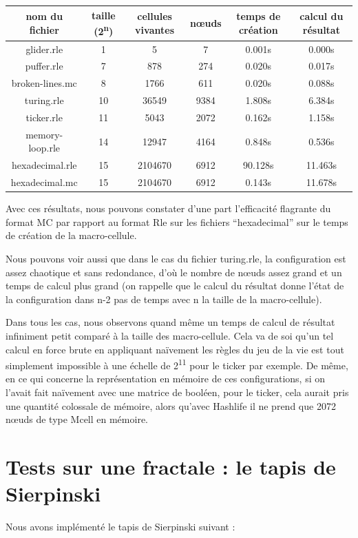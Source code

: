 \documentclass[a4paper,12pt]{report}
\begin{document}
\begin{center}
  \begin{tabular}{| c | c | c | c | c | c |}
    \hline
    nom du fichier & taille (2\textsuperscript{n}) & cellules vivantes
    & n\oe uds & temps de création &
    calcul du résultat \rule[-7pt]{0pt}{20pt} \tabularnewline
    \hline
    glider.rle & 1 & 5 & 7 & 0.001s & 0.000s \tabularnewline
    puffer.rle & 7 & 878 & 274 & 0.020s & 0.017s \tabularnewline
    broken-lines.mc & 8 & 1766 & 611 & 0.020s & 0.088s \tabularnewline
    turing.rle & 10 & 36549 & 9384 & 1.808s & 6.384s \tabularnewline
    ticker.rle & 11 & 5043 & 2072 & 0.162s & 1.158s \tabularnewline
    memory-loop.rle & 14 & 12947 & 4164 & 0.848s & 0.536s \tabularnewline
    hexadecimal.rle & 15 & 2104670 & 6912 & 90.128s & 11.463s \tabularnewline
    hexadecimal.mc & 15 & 2104670 & 6912 & 0.143s & 11.678s \tabularnewline
    \hline
  \end{tabular}
\end{center}

Avec ces résultats, nous pouvons constater d'une part l'efficacité
flagrante du format MC par rapport au format Rle sur les fichiers
``hexadecimal'' sur le temps de création de la macro-cellule.

Nous pouvons voir aussi que dans le cas du fichier turing.rle, la
configuration est assez chaotique et sans redondance, d'où le nombre
de n\oe uds assez grand et un temps de calcul plus grand (on rappelle
que le calcul du résultat donne l'état de la configuration dans n-2
pas de temps avec n la taille de la macro-cellule).

Dans tous les cas, nous observons quand même un temps de calcul de
résultat infiniment petit comparé à la taille des macro-cellule. Cela
va de soi qu'un tel calcul en force brute en appliquant naïvement les
règles du jeu de la vie est tout simplement impossible à une échelle
de 2\textsuperscript{11} pour le ticker par exemple. De même, en ce
qui concerne la représentation en mémoire de ces configurations, si
on l'avait fait naïvement avec une matrice de booléen, pour le ticker,
cela aurait pris une quantité colossale de mémoire, alors qu'avec
Hashlife il ne prend que 2072 n\oe uds de type Mcell en mémoire. 


\section{Tests sur une fractale : le tapis de Sierpinski}

Nous avons implémenté le tapis de Sierpinski suivant :
\end{document}
